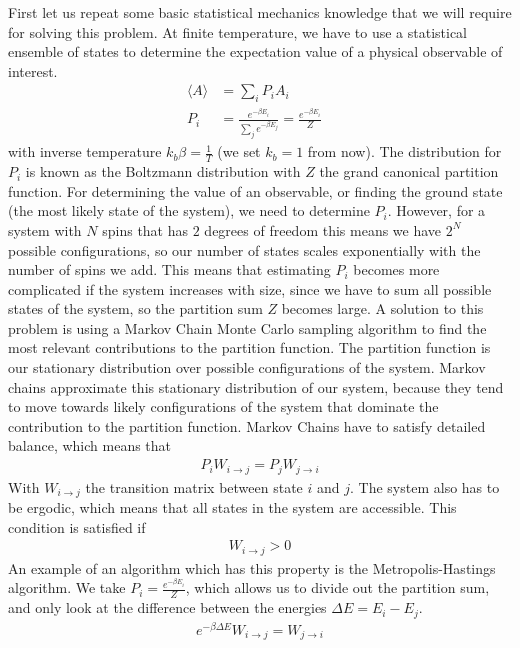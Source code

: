 First let us repeat some basic statistical mechanics knowledge that we will require for solving this problem. At finite temperature, we have to use a statistical ensemble of states to determine the expectation value of a physical observable of interest.
\begin{align*}
\langle A \rangle &= \sum_i P_i A_i\\
 P_i &= \frac{e^{-\beta E_i}}{\sum_j e^{-\beta E_j}} =  \frac{e^{-\beta E_i}}{Z}& 
\end{align*}
with inverse temperature $k_b\beta=\frac{1}{T}$ (we set $k_b=1$ from now). The distribution for $P_i$ is known as the Boltzmann distribution with $Z$ the grand canonical partition function. For determining the value of an observable, or finding the ground state (the most likely state of the system), we need to determine $P_i$. However, for a system with $N$ spins that has $2$ degrees of freedom this means we have $2^N$ possible configurations, so our number of states scales exponentially with the number of spins we add. This means that estimating $P_i$ becomes more complicated if the system increases with size, since we have to sum all possible states of the system, so the partition sum $Z$ becomes large. A solution to this problem is using a Markov Chain Monte Carlo sampling algorithm to find the most relevant contributions to the partition function. The partition function is our stationary distribution over possible configurations of the system. Markov chains approximate this stationary distribution of our system, because they tend to move towards likely configurations of the system that dominate the contribution to the partition function. Markov Chains have to satisfy detailed balance, which means that
\begin{align*}
    P_i W_{i\rightarrow j} = P_j W_{j\rightarrow i}
\end{align*}
With $W_{i\rightarrow j}$ the transition matrix between state $i$ and $j$. The system also has to be ergodic, which means that all states in the system are accessible. This condition is satisfied if 
\begin{align*}
    W_{i\rightarrow j} >0
\end{align*}
An example of an algorithm which has this property is the Metropolis-Hastings algorithm. We take $P_i = \frac{e^{-\beta E_i}}{Z}$, which allows us to divide out the partition sum, and only look at the difference between the energies $\Delta E = E_i - E_j$.
\begin{align*}
    e^{-\beta \Delta E} W_{i\rightarrow j} = W_{j\rightarrow i}
\end{align*}
